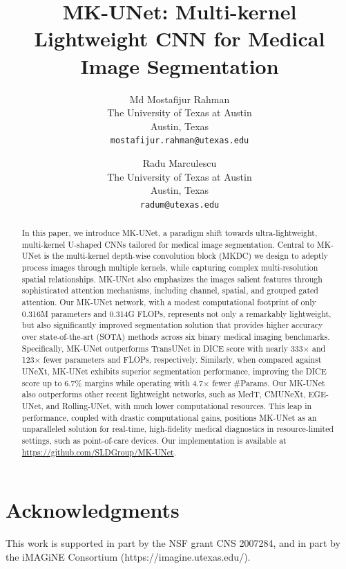 \documentclass[10pt,twocolumn,letterpaper]{article}
\title{MK-UNet: Multi-kernel Lightweight CNN for Medical Image Segmentation}
\author{Md Mostafijur Rahman\\
The University of Texas at Austin\\
Austin, Texas\\
{\tt\small mostafijur.rahman@utexas.edu}
\and
Radu Marculescu\\
The University of Texas at Austin\\
Austin, Texas\\
{\tt\small radum@utexas.edu}
}
\begin{document}
\maketitle


\begin{abstract}
In this paper, we introduce MK-UNet, a paradigm shift towards ultra-lightweight, multi-kernel U-shaped CNNs tailored for medical image segmentation. Central to MK-UNet is the multi-kernel depth-wise convolution block (MKDC) we design to adeptly process images through multiple kernels, while capturing complex multi-resolution spatial relationships. MK-UNet also emphasizes the images salient features through sophisticated attention mechanisms, including channel, spatial, and grouped gated attention. Our MK-UNet network, with a modest computational footprint of only 0.316M parameters and 0.314G FLOPs, represents not only a remarkably lightweight, but also significantly improved segmentation solution that provides higher accuracy over state-of-the-art (SOTA) methods across six binary medical imaging benchmarks. Specifically, MK-UNet outperforms TransUNet in DICE score with nearly 333$\times$ and 123$\times$ fewer parameters and FLOPs, respectively. Similarly, when compared against UNeXt, MK-UNet exhibits superior segmentation performance, improving the DICE score up to 6.7\% margins while operating with 4.7$\times$ fewer \#Params. Our MK-UNet also outperforms other recent lightweight networks, such as MedT, CMUNeXt, EGE-UNet, and Rolling-UNet, with much lower computational resources. This leap in performance, coupled with drastic computational gains, positions MK-UNet as an unparalleled solution for real-time, high-fidelity medical diagnostics in resource-limited settings, such as point-of-care devices. Our implementation is available at \url{https://github.com/SLDGroup/MK-UNet}.

\end{abstract}








\section*{Acknowledgments}
This work is supported in part by the NSF grant CNS 2007284, and in part by the iMAGiNE Consortium (https://imagine.utexas.edu/).
\vspace{-0.2cm}

{
    \small
    
    
}


\end{document}

